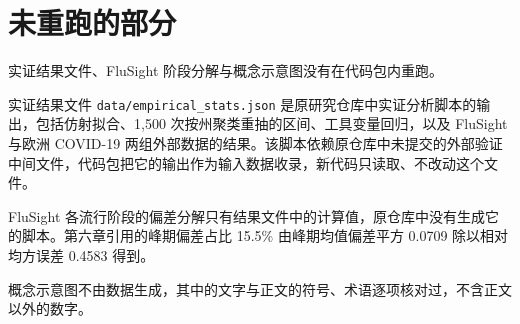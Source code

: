 \section{未重跑的部分}
\label{app:repro-limits}

实证结果文件、FluSight 阶段分解与概念示意图没有在代码包内重跑。

实证结果文件 \nolinkurl{data/empirical_stats.json} 是原研究仓库中实证分析脚本的输出，包括仿射拟合、1,500 次按州聚类重抽的区间、工具变量回归，以及 FluSight 与欧洲 COVID-19 两组外部数据的结果。该脚本依赖原仓库中未提交的外部验证中间文件，代码包把它的输出作为输入数据收录，新代码只读取、不改动这个文件。

FluSight 各流行阶段的偏差分解只有结果文件中的计算值，原仓库中没有生成它的脚本。第六章引用的峰期偏差占比 15.5\% 由峰期均值偏差平方 0.0709 除以相对均方误差 0.4583 得到。

概念示意图不由数据生成，其中的文字与正文的符号、术语逐项核对过，不含正文以外的数字。
